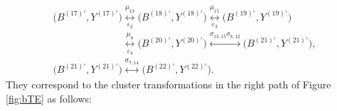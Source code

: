 \documentclass[11pt]{article}
\numberwithin{equation}{section}
\newcommand\bY{Y}
\numberwithin{equation}{section}
\begin{document}
\begin{gather}
\bigl(B^{(17)\prime}, \bY^{(17)\prime}\bigr) \underset{\varepsilon_2}{\overset{\mu_{13}}{\longleftrightarrow} }
\bigl(B^{(18)\prime}, \bY^{(18)\prime}\bigr) \underset{\varepsilon_3}{\overset{\mu_{15}}{\longleftrightarrow} }
\bigl(B^{(19)\prime}, \bY^{(19)\prime}\bigr)\nonumber
\\
\phantom{\bigl(B^{(16)\prime}, \bY^{(16)\prime}\bigr)}{}
\underset{\varepsilon_4}{\overset{\mu_{8}}{\longleftrightarrow} }
\bigl(B^{(20)\prime}, \bY^{(20)\prime}\bigr) \overset{\sigma_{13,15}\sigma_{8,12}}{\longleftrightarrow}
\bigl(B^{(21)\prime}, \bY^{(21)\prime}\bigr),\nonumber
\\
\bigl(B^{(21)\prime}, \bY^{(21)\prime}\bigr) \overset{\sigma_{7,14}}{\longleftrightarrow}
\bigl(B^{(22)\prime}, \bY^{(22)\prime}\bigr).\label{b11R}
\end{gather}
They correspond to the cluster transformations in the right path of Figure \ref{fig:bTE} as follows:
\end{document}
